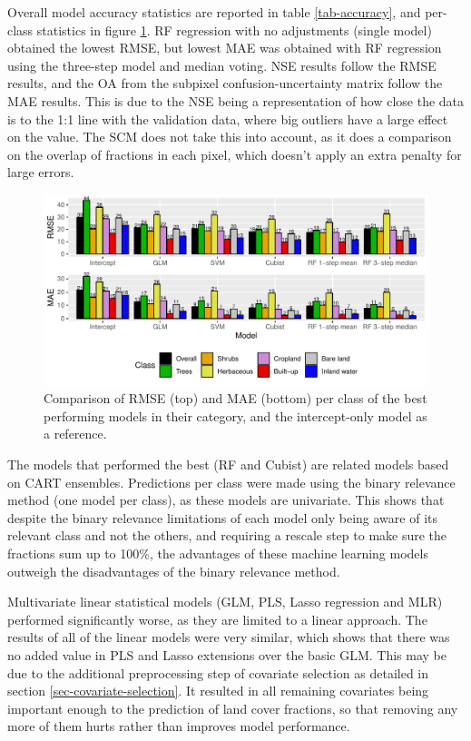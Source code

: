 \documentclass[review,authoryear,3p]{elsarticle}
\begin{document}
Overall model accuracy statistics are reported in table \ref{tab-accuracy}, and per-class statistics in figure \ref{fig-models}.
\Gls{RF} regression with no adjustments (single model) obtained the lowest \gls{RMSE}, but lowest \gls{MAE} was obtained with \gls{RF} regression using the three-step model and median voting.
\gls{NSE} results follow the \gls{RMSE} results, and the \gls{OA} from the subpixel confusion-uncertainty matrix follow the \gls{MAE} results.
This is due to the \gls{NSE} being a representation of how close the data is to the 1:1 line with the validation data, where big outliers have a large effect on the value.
The \gls{SCM} does not take this into account, as it does a comparison on the overlap of fractions in each pixel, which doesn't apply an extra penalty for large errors.

\begin{figure}
    \includegraphics[width=\textwidth]{article/article-figures/barplots/2020-06-03-model-comparison-bar}
    \caption{Comparison of \gls{RMSE} (top) and \gls{MAE} (bottom) per class of the best performing models in their category, and the intercept-only model as a reference.}
    \label{fig-models}
\end{figure}

The models that performed the best (\gls{RF} and Cubist) are related models based on \gls{CART} ensembles.
Predictions per class were made using the binary relevance method (one model per class), as these models are univariate.
This shows that despite the binary relevance limitations of each model only being aware of its relevant class and not the others, and requiring a rescale step to make sure the fractions sum up to 100\%, the advantages of these machine learning models outweigh the disadvantages of the binary relevance method.

Multivariate linear statistical models (\gls{GLM}, \gls{PLS}, Lasso regression and \gls{MLR}) performed significantly worse, as they are limited to a linear approach.
The results of all of the linear models were very similar, which shows that there was no added value in \gls{PLS} and Lasso extensions over the basic \gls{GLM}.
This may be due to the additional preprocessing step of covariate selection as detailed in section \ref{sec-covariate-selection}.
It resulted in all remaining covariates being important enough to the prediction of land cover fractions, so that removing any more of them hurts rather than improves model performance.
\end{document}
